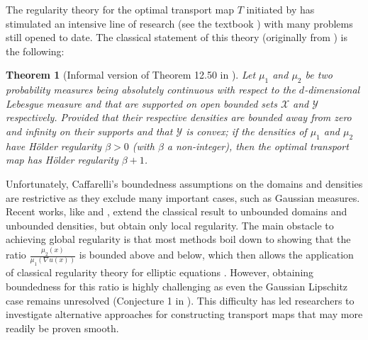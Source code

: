 \documentclass{article}
\newtheorem{theorem}{Theorem}
\begin{document}
The regularity theory for the optimal transport map $T$ initiated by \cite{Caffarelli92} has stimulated an intensive line of research (see the textbook \cite{figalli2017monge}) with many problems still opened to date. The classical statement of this theory (originally from \cite{Caffarelli92}) is the following:

\begin{theorem}[Informal version of Theorem 12.50 in \cite{villani2009optimal}]\label{theorem:caffarellisregularity}
    Let $\mu_1$ and $\mu_2$ be two probability measures being absolutely continuous with respect to the $d$-dimensional Lebesgue measure and that are supported on open bounded sets $\mathcal{X}$ and $\mathcal{Y}$ respectively. Provided that
their respective densities are bounded away from zero and infinity on their supports and that $\mathcal{Y}$ is convex; if the densities of $\mu_1$ and $\mu_2$ have Hölder regularity $\beta>0$ (with $\beta$ a non-integer), then the optimal transport map has Hölder regularity $\beta+1$.
\end{theorem}
 Unfortunately, Caffarelli’s boundedness assumptions on the domains and densities are restrictive as they exclude many important cases, such as Gaussian measures. Recent works, like \cite{Dario2019} and \cite{FigalliJhaveri2023}, extend the classical result to unbounded domains and unbounded densities, but obtain only local regularity. The main obstacle to achieving global regularity is that most methods boil down to showing that the ratio $\frac{\mu_2(x)}{\mu_1(\nabla u(x))}$ is bounded above and below, which then allows the application of classical regularity theory for elliptic equations \citep{de2014monge}. However, obtaining boundedness for this ratio is highly challenging as even the Gaussian Lipschitz case remains unresolved (Conjecture 1 in \cite{fathi2024transportation}). This difficulty has led researchers to investigate alternative approaches for constructing transport maps that may more readily be proven smooth.
\end{document}
